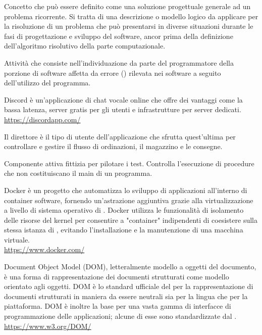 Concetto che può essere definito come una soluzione progettuale generale ad un problema ricorrente. Si tratta di una descrizione o modello logico da applicare per la risoluzione di un problema che può presentarsi in diverse situazioni durante le fasi di progettazione e sviluppo del software, ancor prima della definizione dell'algoritmo risolutivo della parte computazionale.

Attività che consiste nell'individuazione da parte del programmatore della porzione di software affetta da errore () rilevata nei software a seguito dell'utilizzo del programma.

Discord è un’applicazione di chat vocale online che offre dei vantaggi come la bassa latenza, server gratis per gli utenti e infrastrutture per server dedicati.\\
\url{https://discordapp.com/}

Il direttore è il tipo di utente dell’applicazione che sfrutta quest’ultima per controllare e gestire il flusso di ordinazioni, il magazzino e le consegne.

Componente attiva fittizia per pilotare i test. Controlla l’esecuzione di procedure che non costituiscano il main di un programma.

Docker è un progetto  che automatizza lo sviluppo di applicazioni all'interno di container software, fornendo un'astrazione aggiuntiva grazie alla virtualizzazione a livello di sistema operativo di . Docker utilizza le funzionalità di isolamento delle risorse del kernel  per consentire a "container" indipendenti di coesistere sulla stessa istanza di , evitando l'installazione e la manutenzione di una macchina virtuale.\\
\url{https://www.docker.com/}

Document Object Model (DOM), letteralmente modello a oggetti del documento, è una forma di rappresentazione dei documenti strutturati come modello orientato agli oggetti.
DOM è lo standard ufficiale del  per la rappresentazione di documenti strutturati in maniera da essere neutrali sia per la lingua che per la piattaforma. DOM è inoltre la base per una vasta gamma di interfacce di programmazione delle applicazioni; alcune di esse sono standardizzate dal .\\
\url{https://www.w3.org/DOM/}
\clearpage